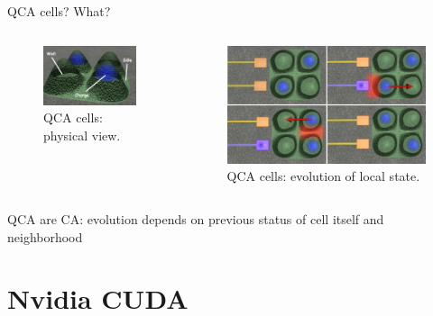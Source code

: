 \documentclass[10pt, red]{beamer}
\begin{document}
	\begin{frame}{QCA cells? What?}
		\begin{columns}
		 	\begin{figure}
				\centering
				\includegraphics[width=\textwidth]{img/qca.png}
				\caption{QCA cells: physical view.}
		 	\end{figure} 
			\begin{figure}
				\centering
				\includegraphics[width=\textwidth]{img/qcaevo.png}
				\caption{QCA cells: evolution of local state.}
			\end{figure}
		\end{columns}
		QCA are CA: evolution depends on previous status of cell itself and neighborhood
	\end{frame}


\section{Nvidia CUDA}
\end{document}
